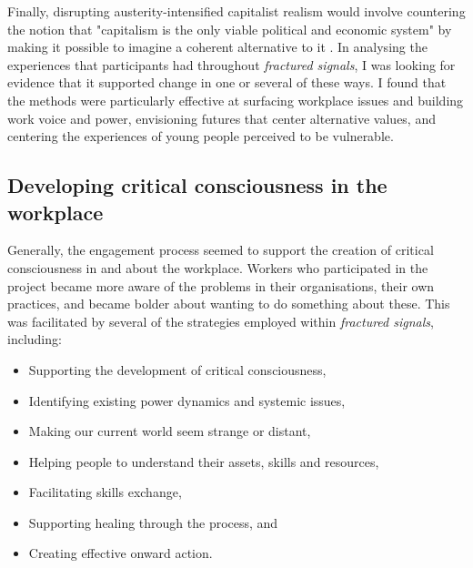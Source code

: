 Finally, disrupting austerity-intensified capitalist realism would involve countering the notion that  "capitalism is the only viable political and economic system" by making it possible to imagine a coherent alternative to it \citep[p. 2]{fisher_capitalist_2009}. In analysing the experiences that participants had throughout \textit{fractured signals}, I was looking for evidence that it supported change in one or several of these ways. I found that the methods were particularly effective at surfacing workplace issues and building work voice and power, envisioning futures that center alternative values, and centering the experiences of young people perceived to be vulnerable.

\subsection{Developing critical consciousness in the workplace}
Generally, the engagement process seemed to support the creation of critical consciousness in and about the workplace. Workers who participated in the project became more aware of the problems in their organisations, their own practices, and became bolder about wanting to do something about these. This was facilitated by several of the strategies employed within \textit{fractured signals}, including:
\begin{itemize}
    \item Supporting the development of critical consciousness,
    \item Identifying existing power dynamics and systemic issues,
    \item Making our current world seem strange or distant,
    \item Helping people to understand their assets, skills and resources,
    \item Facilitating skills exchange,
    \item Supporting healing through the process, and
    \item Creating effective onward action.
\end{itemize}

